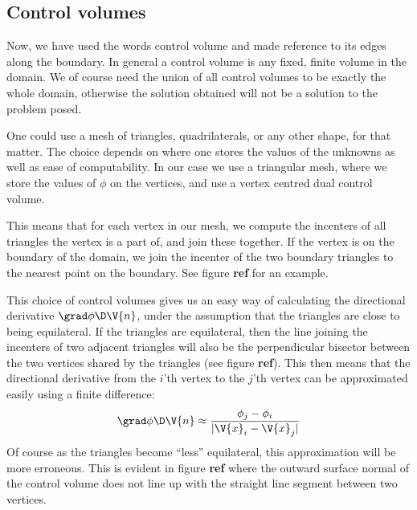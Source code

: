\documentclass[sigconf]{acmart}
\begin{document}
\subsection{Control volumes}
Now, we have used the words control volume and made reference to its edges along the boundary. In general a control volume is any fixed, finite volume in the domain. We of course need the union of all control volumes to be exactly the whole domain, otherwise the solution obtained will not be a solution to the problem posed.

One could use a mesh of triangles, quadrilaterals, or any other shape, for that matter. The choice depends on where one stores the values of the unknowns as well as ease of computability. In our case we use a triangular mesh, where we store the values of $ \phi $ on the vertices, and use a vertex centred dual control volume. 

This means that for each vertex in our mesh, we compute the incenters of all triangles the vertex is a part of, and join these together. If the vertex is on the boundary of the domain, we join the incenter of the two boundary triangles to the nearest point on the boundary. See figure \textbf{ref} for an example.

This choice of control volumes gives us an easy way of calculating the directional derivative $ \grad\phi \D \V{n} $, under the assumption that the triangles are close to being equilateral. If the triangles are equilateral, then the line joining the incenters of two adjacent triangles will also be the perpendicular bisector between the two vertices shared by the triangles (see figure \textbf{ref}). This then means that the directional derivative from the $ i $'th vertex to the $ j $'th vertex can be approximated easily using a finite difference:
\begin{equation}\label{key}
	\grad \phi \D \V{n} \approx \frac{\phi_j - \phi_i}{|\V{x}_i-\V{x}_j|}
\end{equation}
Of course as the triangles become ``less'' equilateral, this approximation will be more erroneous. This is evident in figure \textbf{ref} where the outward surface normal of the control volume does not line up with the straight line segment between two vertices.
\end{document}
